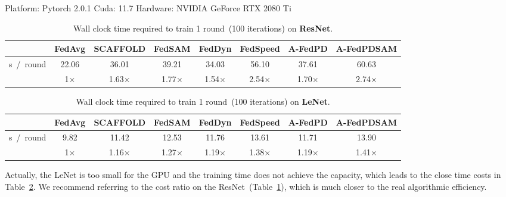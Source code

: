 Platform: Pytorch 2.0.1 \quad \quad
Cuda: 11.7 \quad \quad
Hardware: NVIDIA GeForce RTX 2080 Ti
\begin{table}[h]
\centering
\vspace{-0.2cm}
\caption{Wall clock time required to train 1 round~(100 iterations) on \textbf{ResNet}.}
\vspace{0.05cm}
\small
\renewcommand\arraystretch{1.5}
\begin{tabular}{|c|ccccccc|}
\toprule
 & FedAvg & SCAFFOLD & FedSAM & FedDyn & FedSpeed & A-FedPD & A-FedPDSAM \\
\midrule
s\ /\ round & 22.06 & 36.01 & 39.21 & 34.03 & 56.10 & 37.61 & 60.63 \\
\cmidrule(lr){2-8}
            & 1$\times$ & 1.63$\times$ & 1.77$\times$ & 1.54$\times$ & 2.54$\times$ & 1.70$\times$ & 2.74$\times$ \\
\bottomrule
\end{tabular}
\label{tb:wall-clock time on resnet}
\end{table}

\begin{table}[h]
\centering
\vspace{-0.4cm}
\caption{Wall clock time required to train 1 round~(100 iterations) on \textbf{LeNet}.}
\vspace{0.05cm}
\small
\renewcommand\arraystretch{1.5}
\begin{tabular}{|c|ccccccc|}
\toprule
 & FedAvg & SCAFFOLD & FedSAM & FedDyn & FedSpeed & A-FedPD & A-FedPDSAM \\
\midrule
s\ /\ round & 9.82 & 11.42 & 12.53 & 11.76 & 13.61 & 11.71 & 13.90 \\
\cmidrule(lr){2-8}
            & 1$\times$ & 1.16$\times$ & 1.27$\times$ & 1.19$\times$ & 1.38$\times$ & 1.19$\times$ & 1.41$\times$ \\
\bottomrule
\end{tabular}
\label{tb:wall-clock time on lenet}
\end{table}

Actually, the LeNet is too small for the GPU and the training time does not achieve the capacity, which leads to the close time costs in Table~\ref{tb:wall-clock time on lenet}. We recommend referring to the cost ratio on the ResNet~(Table~\ref{tb:wall-clock time on resnet}), which is much closer to the real algorithmic efficiency.























